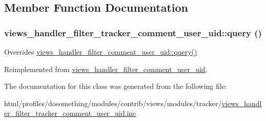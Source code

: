 \subsection{Member Function Documentation}
\hypertarget{classviews__handler__filter__tracker__comment__user__uid_a95b14e84882db3a1911c885c606e8835}{
\subsubsection[{query}]{\setlength{\rightskip}{0pt plus 5cm}views\_\-handler\_\-filter\_\-tracker\_\-comment\_\-user\_\-uid::query ()}}
\label{classviews__handler__filter__tracker__comment__user__uid_a95b14e84882db3a1911c885c606e8835}
Overrides \hyperlink{classviews__handler__filter__comment__user__uid_a5b649bd04038ac8ed577410ad54ad5b0}{views\_\-handler\_\-filter\_\-comment\_\-user\_\-uid::query()} 

Reimplemented from \hyperlink{classviews__handler__filter__comment__user__uid_a5b649bd04038ac8ed577410ad54ad5b0}{views\_\-handler\_\-filter\_\-comment\_\-user\_\-uid}.

The documentation for this class was generated from the following file:\begin{DoxyCompactItemize}
\item 
html/profiles/dosomething/modules/contrib/views/modules/tracker/\hyperlink{views__handler__filter__tracker__comment__user__uid_8inc}{views\_\-handler\_\-filter\_\-tracker\_\-comment\_\-user\_\-uid.inc}\end{DoxyCompactItemize}
